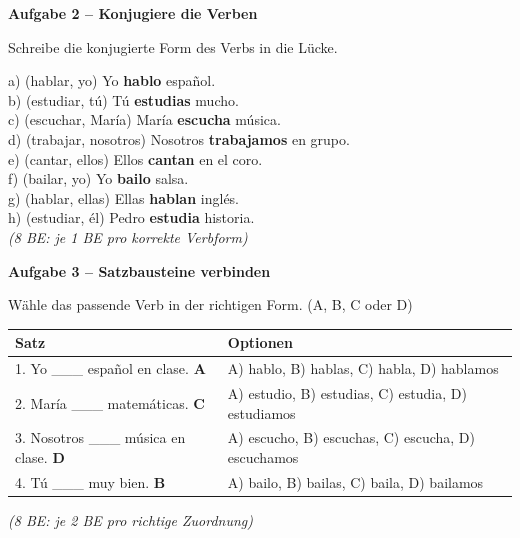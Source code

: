\documentclass[11pt, a4paper]{article}
\newcommand{\fachfarbe}{spanisch}
\newcommand{\punktebox}[1]{\hfill\fbox{\small \_\_\_/#1}}
\newcommand{\lsg}[1]{\textcolor{loesung}{\textbf{#1}}}
\newenvironment{aufgabe}[1]{%
    \vspace{12pt}
    \noindent\textbf{\textcolor{\fachfarbe}{Aufgabe #1}}
    \vspace{6pt}
    \begin{list}{}{\leftmargin=0pt}
    \item[]
}{%
    \end{list}
}
\begin{document}
\begin{aufgabe}{2 -- Konjugiere die Verben}
Schreibe die konjugierte Form des Verbs in die Lücke. \punktebox{8}
\end{aufgabe}

\noindent
a) (hablar, yo) Yo \lsg{hablo} español.\\[0.8em]
b) (estudiar, tú) Tú \lsg{estudias} mucho.\\[0.8em]
c) (escuchar, María) María \lsg{escucha} música.\\[0.8em]
d) (trabajar, nosotros) Nosotros \lsg{trabajamos} en grupo.\\[0.8em]
e) (cantar, ellos) Ellos \lsg{cantan} en el coro.\\[0.8em]
f) (bailar, yo) Yo \lsg{bailo} salsa.\\[0.8em]
g) (hablar, ellas) Ellas \lsg{hablan} inglés.\\[0.8em]
h) (estudiar, él) Pedro \lsg{estudia} historia.\\

\textcolor{loesung}{\textit{(8 BE: je 1 BE pro korrekte Verbform)}}

\vspace{15pt}


\begin{aufgabe}{3 -- Satzbausteine verbinden}
Wähle das passende Verb in der richtigen Form. (A, B, C oder D) \punktebox{8}
\end{aufgabe}

\noindent
\begin{tabular}{|p{7.5cm}|p{5cm}|}
\hline
\textbf{Satz} & \textbf{Optionen} \\
\hline
1. Yo \_\_\_ español en clase. \lsg{A} & A) hablo, B) hablas, C) habla, D) hablamos \\[0.5em]
2. María \_\_\_ matemáticas. \lsg{C} & A) estudio, B) estudias, C) estudia, D) estudiamos \\[0.5em]
3. Nosotros \_\_\_ música en clase. \lsg{D} & A) escucho, B) escuchas, C) escucha, D) escuchamos \\[0.5em]
4. Tú \_\_\_ muy bien. \lsg{B} & A) bailo, B) bailas, C) baila, D) bailamos \\
\hline
\end{tabular}

\textcolor{loesung}{\textit{(8 BE: je 2 BE pro richtige Zuordnung)}}
\end{document}
